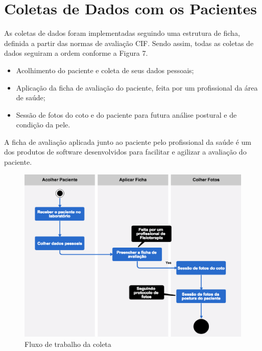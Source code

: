 \section{Coletas de Dados com os Pacientes}


    As coletas de dados foram implementadas seguindo uma estrutura de ficha, definida a partir das normas de avaliação CIF. Sendo assim, todas as coletas de dados seguiram a ordem conforme a Figura 7. 

    \begin{itemize}
        \item Acolhimento do paciente e coleta de seus dados pessoais;
        \item Aplicação da ficha de avaliação do paciente, feita por um profissional da área de saúde;
        \item Sessão de fotos do coto e do paciente para futura análise postural e de condição da pele.
    \end{itemize}

    A ficha de avaliação aplicada junto ao paciente pelo profissional da saúde é um dos produtos de software desenvolvidos para facilitar e agilizar a avaliação do paciente.

    \begin{figure}[ht]
        \centering
        \label{fig07}
            \includegraphics[keepaspectratio=true, scale=0.4]{editaveis/images/colet_flow.eps}
        \caption{Fluxo de trabalho da coleta}
    \end{figure}

